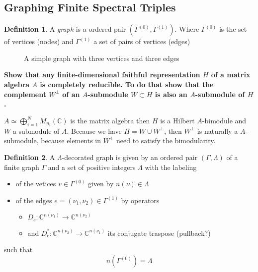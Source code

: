 \documentclass[a4paper]{article}
\newcounter{exercise}
\newenvironment{MyExercise}%
{\begin{mdframed}[style=exercisestyle]}{\end{mdframed}}
\theoremstyle{definition}
\newtheorem{definition}{Definition}
\theoremstyle{definition}
\theoremstyle{definition}
\theoremstyle{theorem}
\theoremstyle{theorem}
\begin{document}
\subsection{Graphing Finite Spectral Triples}
\begin{definition}
    A \textit{graph} is a ordered pair $(\Gamma ^{(0)}, \Gamma ^{(1)})$.
    Where $\Gamma ^{(0)}$ is the set of vertices (nodes) and $\Gamma ^{(1)}$
    a set of pairs of vertices (edges)
\end{definition}
\begin{figure}[h!]
    \centering
{}
    \caption{A simple graph with three vertices and three edges}
\end{figure}
\begin{MyExercise}
    \textbf{
    Show that any finite-dimensional faithful representation $H$ of a matrix
    algebra $A$ is completely reducible. To do that show that the complement
    $W^{\perp}$ of an $A$-submodule $W\subset H$ is also an $A$-submodule
    of $H$.
}\newline

    $A\simeq \bigoplus_{i=1}^N M_{n_i}(\mathbb{C})$ is the matrix algebra
    then $H$ is a Hilbert $A$-bimodule and $W$ a submodule of $A$.
    Because we have $H = W \cup W^{\perp}$, then $W^{\perp}$ is naturally a
    $A$-submodule, because elements in $W^{\perp}$ need to satisfy the
    bimodularity.
\end{MyExercise}
\begin{definition}
    A $\Lambda$-decorated graph is given by an ordered pair $(\Gamma,
    \Lambda)$ of a finite graph $\Gamma$ and a set of positive integers
    $\Lambda$ with the labeling
    \begin{itemize}
        \item of the vetices $v\in \Gamma ^{(0)}$ given by $n(\nu) \in
            \Lambda$
        \item of the edges $e = (\nu _1, \nu _2) \in \Gamma ^{(1)}$ by
            operators
            \begin{itemize}
                \item $D_e: \mathbb{C}^{n(\nu _1)} \rightarrow
                    \mathbb{C}^{n(\nu _2)}$
                \item and $D_e^*: \mathbb{C}^{n(\nu _2)} \rightarrow
                    \mathbb{C}^{n(\nu _1)}$ its conjugate traspose
                    (pullback?)
            \end{itemize}
    \end{itemize}
    such that
    \begin{equation}
        n(\Gamma ^{(0)}) = \Lambda
    \end{equation}
\end{definition}
\end{document}
